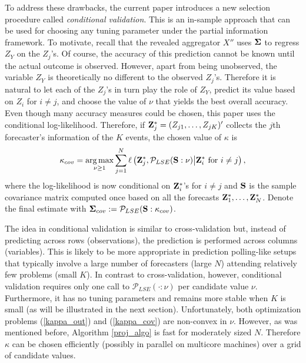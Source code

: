 \documentclass[11pt]{article}
\DeclareMathOperator*{\argmax}{arg\,max}
\theoremstyle{definition}
\theoremstyle{definition}
\def\bSigma{{\bf \Sigma}}
\def\Z{{\bf Z}}
\def\SS{{\bf S}}
\begin{document}
To address these drawbacks, the current paper introduces a new selection procedure called \textit{conditional validation}. This is an in-sample approach that can be used for choosing any tuning parameter under the partial information framework. To motivate, recall that the revealed aggregator $X''$ uses $\bSigma$ to regress  $Z_Y$ on the $Z_{j}$'s. 
 Of course, the accuracy of this prediction cannot be known until the actual outcome is observed. However, apart from being unobserved, the variable $Z_Y$ is theoretically no different to the observed $Z_{j}$'s. Therefore it is natural to let each of the $Z_{j}$'s in turn play the role of $Z_Y$, predict its value based on $Z_{i}$ for $i \neq j$, and choose the value of $\nu$ that yields the best overall accuracy. Even though many accuracy measures could be chosen, this paper uses the conditional log-likelihood. Therefore, if $\Z_j^* = (Z_{j1}, \dots, Z_{jK})'$ collects the $j$th forecaster's information of the $K$ events, the chosen value of $\kappa$ is
  \begin{align}
\kappa_{cov} = \argmax_{\nu \geq 1} \sum_{j=1}^N \ell \left( \Z_{j}^*, \mathcal{P}_{LSE}(\SS : \nu) \big| \Z_i^* \text{ for } i \neq j\right), \label{kappa_cov}
\end{align}
where the log-likelihood is now conditional on $\Z_i^*$'s for $i \neq j$ and $\SS$ is the sample covariance matrix computed once based on all the forecasts $\Z_1^*, \dots, \Z_N^*$. Denote the final estimate with $\bSigma_{cov} := \mathcal{P}_{LSE}(\SS : \kappa_{cov})$.  

The idea in conditional validation is similar to cross-validation but, instead of predicting across rows (observations), the prediction is  performed across columns (variables).  This is likely to be more appropriate in prediction polling-like setups that typically involve a large number of forecasters (large $N$) attending relatively few problems (small $K$). In contrast to cross-validation, however, conditional validation requires only one call to $\mathcal{P}_{LSE}( \cdot : \nu)$ per candidate value $\nu$. Furthermore, it has no tuning parameters and remains more stable when $K$ is small (as will be illustrated in the next section).
Unfortunately, both optimization problems (\ref{kappa_out}) and (\ref{kappa_cov}) are non-convex in $\nu$.  However, as was mentioned before, Algorithm \ref{proj_algo} is fast for moderately sized $N$. Therefore $\kappa$ can be chosen efficiently (possibly in parallel on multicore machines) over a  grid of candidate values. 
\end{document}
